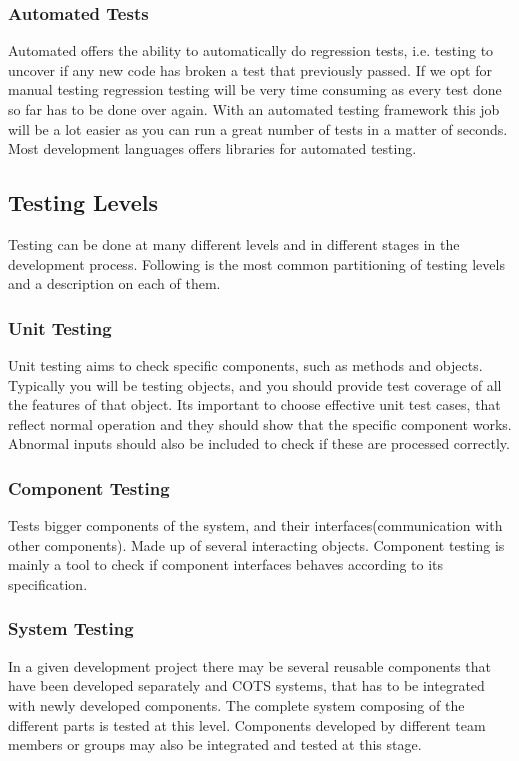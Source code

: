 \subsubsection{Automated Tests}
Automated offers the ability to automatically do regression tests, i.e. testing to uncover if any new code has broken a test that previously passed. If we opt for manual testing regression testing will be very time consuming as every test done so far has to be done over again. With an automated testing framework this job will be a lot easier as you can run a great number of tests in a matter of seconds. Most development languages offers libraries for automated testing.


\subsection{Testing Levels}
Testing can be done at many different levels and in different stages in the development process. Following is the most common partitioning of testing levels and a description on each of them.

\subsubsection{Unit Testing}
Unit testing aims to check specific components, such as methods and objects. Typically you will be testing objects, and you should provide test coverage of all the features of that object. Its important to choose effective unit test cases, that reflect normal operation and they should show that the specific component works. Abnormal inputs should also be included to check if these are processed correctly.

\subsubsection{Component Testing}
Tests bigger components of the system, and their interfaces(communication with other components). Made up of several interacting objects. Component testing is mainly a tool to check if component interfaces behaves according to its specification.

\subsubsection{System Testing}
In a given development project there may be several reusable components that have been developed separately and COTS systems, that has to be integrated with newly developed components. The complete system composing of the different parts is tested at this level. Components developed by different team members or groups may also be integrated and tested at this stage.

